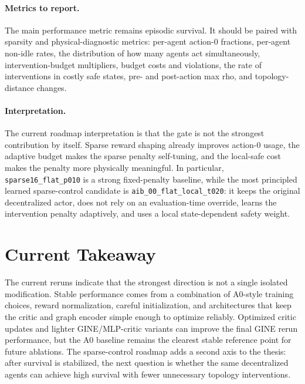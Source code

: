 \paragraph{Metrics to report.}
The main performance metric remains episodic survival. It should be paired with
sparsity and physical-diagnostic metrics: per-agent action-0 fractions,
per-agent non-idle rates, the distribution of how many agents act
simultaneously, intervention-budget multipliers, budget costs and violations,
the rate of interventions in costly safe states, pre- and post-action max rho,
and topology-distance changes.

\paragraph{Interpretation.}
The current roadmap interpretation is that the gate is not the strongest
contribution by itself. Sparse reward shaping already improves action-0 usage,
the adaptive budget makes the sparse penalty self-tuning, and the local-safe
cost makes the penalty more physically meaningful. In particular,
\texttt{sparse16\_flat\_p010} is a strong fixed-penalty baseline, while the
most principled learned sparse-control candidate is
\texttt{aib\_00\_flat\_local\_t020}: it keeps the original decentralized actor,
does not rely on an evaluation-time override, learns the intervention penalty
adaptively, and uses a local state-dependent safety weight.

\section{Current Takeaway}
\label{sec:current-results-takeaway}

The current reruns indicate that the strongest direction is not a single
isolated modification. Stable performance comes from a combination of A0-style
training choices, reward normalization, careful initialization, and architectures
that keep the critic and graph encoder simple enough to optimize reliably.
Optimized critic updates and lighter GINE/MLP-critic variants can improve the
final GINE rerun performance, but the A0 baseline remains the clearest stable
reference point for future ablations. The sparse-control roadmap adds a second
axis to the thesis: after survival is stabilized, the next question is whether
the same decentralized agents can achieve high survival with fewer unnecessary
topology interventions.
